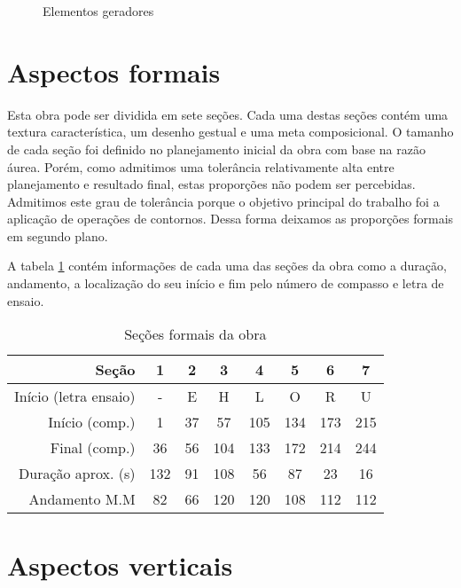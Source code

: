 \begin{figure}
  \centering
  \caption{Elementos geradores}
  \label{fig:elementos-geradores}
\end{figure}

\section{Aspectos formais}
\label{sec:aspectos-formais}

Esta obra pode ser dividida em sete seções. Cada uma destas seções
contém uma textura característica, um desenho gestual e uma meta
composicional. O tamanho de cada seção foi definido no planejamento
inicial da obra com base na razão áurea. Porém, como admitimos uma
tolerância relativamente alta entre planejamento e resultado final,
estas proporções não podem ser percebidas. Admitimos este grau de
tolerância porque o objetivo principal do trabalho foi a aplicação de
operações de contornos. Dessa forma deixamos as proporções formais em
segundo plano.

A tabela \ref{tab:secoes-obra} contém informações de cada uma das
seções da obra como a duração, andamento, a localização do seu início
e fim pelo número de compasso e letra de ensaio.

\begin{table}
  \centering
  \begin{tabular}{r|ccccccc}
    Seção & 1 & 2 & 3 & 4 & 5 & 6 & 7 \\
    \hline
    Início (letra ensaio) & - & E & H & L & O & R & U \\
    Início (comp.) & 1 & 37 & 57 & 105 & 134 & 173 & 215 \\
    Final (comp.) & 36 & 56 & 104 & 133 & 172 & 214 & 244 \\
    Duração aprox. (s) & 132 & 91 & 108 & 56 & 87 & 23 & 16\\
    Andamento M.M & 82 & 66 & 120 & 120 & 108 & 112 & 112 \\
  \end{tabular}
  \caption{Seções formais da obra}
  \label{tab:secoes-obra}
\end{table}

\section{Aspectos verticais}
\label{sec:aspectos-verticais}

